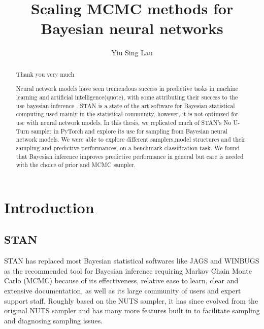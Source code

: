 \documentclass[]{report}
\title{Scaling MCMC methods for Bayesian neural networks}
\author{Yiu Sing Lau}
\date{}
\begin{document}
\maketitle

\renewcommand{\abstractname}{ACKNOWLEDGEMENTS}
\begin{abstract}
Thank you very much

\end{abstract}

\renewcommand{\abstractname}{ABSTRACT}

\begin{abstract}
Neural network models have seen tremendous success in predictive tasks in machine learning and artificial intelligence(quote), with some attributing their success to the use bayesian inference \cite{mandt2017stochastic}. STAN is a state of the art software for Bayesian statistical computing used mainly in the statistical community, however, it is not optimzed for use with neural network models. In this thesis, we replicated much of STAN's No U-Turn sampler in PyTorch and explore its use for sampling from Bayesian neural network models. We were able to explore different samplers,model structures and their sampling and predictive performances, on a benchmark classification task. We found that Bayesian inference improves predictive performance in general but care is needed with the choice of prior and MCMC sampler. 

\end{abstract}
\tableofcontents 

\chapter{Introduction}
\section{STAN}

STAN has replaced most Bayesian statistical softwares like JAGS and WINBUGS as the recommended tool for Bayesian inference requiring Markov Chain Monte Carlo (MCMC)  because of its effectiveness, relative ease to learn, clear and extensive documentation, as well as its large community of users and expert support staff. Roughly based on the NUTS sampler, it has since evolved from the original NUTS sampler and has many more features built in to facilitate sampling and diagnosing sampling issues.
\end{document}
